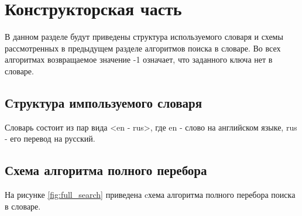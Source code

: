 \chapter{Конструкторская часть}

В данном разделе будут приведены структура используемого словаря и схемы рассмотренных в предыдущем разделе алгоритмов поиска в словаре. Во всех алгоритмах возвращаемое значение -1 означает, что заданного ключа нет в словаре. 

\section{Структура импользуемого словаря}
Словарь состоит из пар вида <en - rus>, где en - слово на английском языке, rus - его перевод на русский.

\section{Схема алгоритма полного перебора}



На рисунке \ref{fig:full_search} приведена cхема алгоритма полного перебора поиска в словаре.

